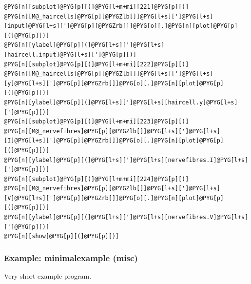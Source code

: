 \documentclass[letterpaper,10pt,english]{manual}
\begin{document}
\begin{Verbatim}[commandchars=@\[\]]
@PYG[n][subplot]@PYG[p][(]@PYG[l+m+mi][221]@PYG[p][)]
@PYG[n][M@_haircells]@PYG[p][@PYGZlb[]]@PYG[l+s][']@PYG[l+s][input]@PYG[l+s][']@PYG[p][@PYGZrb[]]@PYG[o][.]@PYG[n][plot]@PYG[p][(]@PYG[p][)]
@PYG[n][ylabel]@PYG[p][(]@PYG[l+s][']@PYG[l+s][haircell.input]@PYG[l+s][']@PYG[p][)]
@PYG[n][subplot]@PYG[p][(]@PYG[l+m+mi][222]@PYG[p][)]
@PYG[n][M@_haircells]@PYG[p][@PYGZlb[]]@PYG[l+s][']@PYG[l+s][y]@PYG[l+s][']@PYG[p][@PYGZrb[]]@PYG[o][.]@PYG[n][plot]@PYG[p][(]@PYG[p][)]
@PYG[n][ylabel]@PYG[p][(]@PYG[l+s][']@PYG[l+s][haircell.y]@PYG[l+s][']@PYG[p][)]
@PYG[n][subplot]@PYG[p][(]@PYG[l+m+mi][223]@PYG[p][)]
@PYG[n][M@_nervefibres]@PYG[p][@PYGZlb[]]@PYG[l+s][']@PYG[l+s][I]@PYG[l+s][']@PYG[p][@PYGZrb[]]@PYG[o][.]@PYG[n][plot]@PYG[p][(]@PYG[p][)]
@PYG[n][ylabel]@PYG[p][(]@PYG[l+s][']@PYG[l+s][nervefibres.I]@PYG[l+s][']@PYG[p][)]
@PYG[n][subplot]@PYG[p][(]@PYG[l+m+mi][224]@PYG[p][)]
@PYG[n][M@_nervefibres]@PYG[p][@PYGZlb[]]@PYG[l+s][']@PYG[l+s][V]@PYG[l+s][']@PYG[p][@PYGZrb[]]@PYG[o][.]@PYG[n][plot]@PYG[p][(]@PYG[p][)]
@PYG[n][ylabel]@PYG[p][(]@PYG[l+s][']@PYG[l+s][nervefibres.V]@PYG[l+s][']@PYG[p][)]
@PYG[n][show]@PYG[p][(]@PYG[p][)]
\end{Verbatim}

\resetcurrentobjects
\hypertarget{--doc-examples-misc_minimalexample}{}

\hypertarget{index-53}{}\subsubsection{Example: minimalexample (misc)}

Very short example program.
\end{document}
